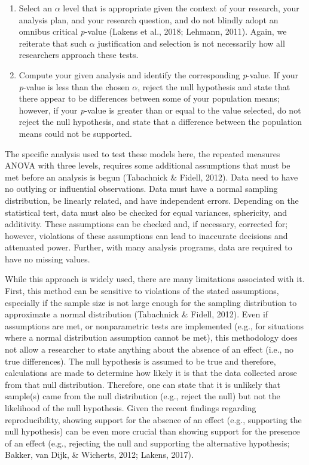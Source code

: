 \documentclass[,man, mask]{apa6}
\theoremstyle{definition}
\theoremstyle{definition}
\theoremstyle{definition}
\theoremstyle{remark}
\begin{document}
\begin{enumerate}
\def\labelenumi{\arabic{enumi})}
\setcounter{enumi}{1}
\item
  Select an \(\alpha\) level that is appropriate given the context of
  your research, your analysis plan, and your research question, and do
  not blindly adopt an omnibus critical \emph{p}-value (Lakens et al.,
  2018; Lehmann, 2011). Again, we reiterate that such \(\alpha\)
  justification and selection is not necessarily how all researchers
  approach these tests.
\item
  Compute your given analysis and identify the corresponding
  \emph{p}-value. If your \emph{p}-value is less than the chosen
  \(\alpha\), reject the null hypothesis and state that there appear to
  be differences between some of your population means; however, if your
  \emph{p}-value is greater than or equal to the value selected, do not
  reject the null hypothesis, and state that a difference between the
  population means could not be supported.
\end{enumerate}

The specific analysis used to test these models here, the repeated
measures ANOVA with three levels, requires some additional assumptions
that must be met before an analysis is begun (Tabachnick \& Fidell,
2012). Data need to have no outlying or influential observations. Data
must have a normal sampling distribution, be linearly related, and have
independent errors. Depending on the statistical test, data must also be
checked for equal variances, sphericity, and additivity. These
assumptions can be checked and, if necessary, corrected for; however,
violations of these assumptions can lead to inaccurate decisions and
attenuated power. Further, with many analysis programs, data are
required to have no missing values.

While this approach is widely used, there are many limitations
associated with it. First, this method can be sensitive to violations of
the stated assumptions, especially if the sample size is not large
enough for the sampling distribution to approximate a normal
distribution (Tabachnick \& Fidell, 2012). Even if assumptions are met,
or nonparametric tests are implemented (e.g., for situations where a
normal distribution assumption cannot be met), this methodology does not
allow a researcher to state anything about the absence of an effect
(i.e., no true differences). The null hypothesis is assumed to be true
and therefore, calculations are made to determine how likely it is that
the data collected arose from that null distribution. Therefore, one can
state that it is unlikely that sample(s) came from the null distribution
(e.g., reject the null) but not the likelihood of the null hypothesis.
Given the recent findings regarding reproducibility, showing support for
the absence of an effect (e.g., supporting the null hypothesis) can be
even more crucial than showing support for the presence of an effect
(e.g., rejecting the null and supporting the alternative hypothesis;
Bakker, van Dijk, \& Wicherts, 2012; Lakens, 2017).
\end{document}

